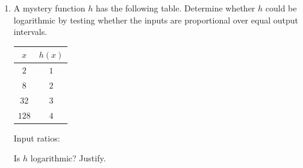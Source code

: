 \documentclass[10pt]{article}
\begin{document}
\begin{tcolorbox}[colback=white, colframe=black!40,
    title=\textbf{Tier E --- Extension},
    fonttitle=\bfseries, arc=2mm, left=3mm, right=3mm, top=2mm, bottom=2mm]
\begin{enumerate}[leftmargin=1.8em, itemsep=10pt]
\vspace{4pt}
Are the inputs of $g$ proportional?  \quad This confirms EK 2.11.A.3.

\begin{teachernote}
For $g(x) = \log_3(x+2) = k$: $x + 2 = 3^k$, so $x = 3^k - 2$.
$k=0$: $x=-1$; $k=1$: $x=1$; $k=2$: $x=7$; $k=3$: $x=25$; $k=4$: $x=79$.
Ratios are not constant, confirming that the additive shift destroys the proportional-input property.
\end{teachernote}

\item A mystery function $h$ has the following table. Determine whether $h$ could be
      logarithmic by testing whether the inputs are proportional over equal output intervals.

\vspace{4pt}
\begin{center}
\renewcommand{\arraystretch}{1.8}
\begin{tabular}{|c|c|}
\hline
\rowcolor{sky}
$x$ & $h(x)$ \\
\hline
$2$  & $1$ \\
\hline
$8$  & $2$ \\
\hline
$32$ & $3$ \\
\hline
$128$& $4$ \\
\hline
\end{tabular}
\end{center}

\vspace{4pt}
Input ratios: 

\vspace{4pt}
Is $h$ logarithmic? Justify. 

\end{enumerate}
\end{tcolorbox}
\end{document}
